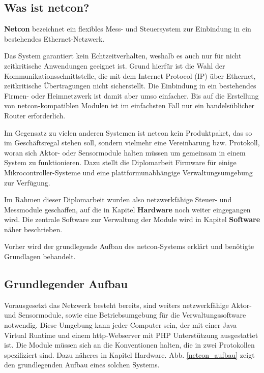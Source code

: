 \documentclass[a4paper,14pt,headsepline]{scrartcl}
\begin{document}
\subsection{Was ist netcon?}
\textbf{Netcon} bezeichnet ein flexibles Mess- und Steuersystem zur Einbindung in ein bestehendes Ethernet-Netzwerk. 

Das System garantiert kein Echtzeitverhalten, weshalb es auch nur für nicht zeitkritische Anwendungen geeignet ist. Grund hierfür ist die Wahl der Kommunikationsschnittstelle, die mit dem Internet Protocol (IP) über Ethernet, zeitkritische Übertragungen nicht sicherstellt. Die Einbindung in ein bestehendes Firmen- oder Heimnetzwerk ist damit aber umso einfacher. Bis auf die Erstellung von netcon-kompatiblen Modulen ist im einfachsten Fall nur ein handelsüblicher Router erforderlich.

Im Gegensatz zu vielen anderen Systemen ist netcon kein Produktpaket, das so im Geschäftsregal stehen soll, sondern vielmehr eine Vereinbarung bzw. Protokoll, woran sich Aktor- oder Sensormodule halten müssen um gemeinsam in einem System zu funktionieren. Dazu stellt die Diplomarbeit Firmware für einige Mikrocontroller-Systeme und eine plattformunabhängige Verwaltungsumgebung zur Verfügung. 

Im Rahmen dieser Diplomarbeit wurden also netzwerkfähige Steuer- und Messmodule geschaffen, auf die in Kapitel \textbf{Hardware} noch weiter eingegangen wird. Die zentrale Software zur Verwaltung der Module wird in Kapitel \textbf{Software} näher beschrieben. 

Vorher wird der grundlegende Aufbau des netcon-Systems erklärt und benötigte Grundlagen behandelt.

\subsection{Grundlegender Aufbau}
Vorausgesetzt das Netzwerk besteht bereits, sind weiters netzwerkfähige Aktor- und Sensormodule, sowie eine Betriebsumgebung für die Verwaltungssoftware notwendig. Diese Umgebung kann jeder Computer sein, der mit einer Java Virtual Runtime und einem http-Webserver mit PHP Unterstützung ausgestattet ist. Die Module müssen sich an die Konventionen halten, die in zwei Protokollen spezifiziert sind. Dazu näheres in Kapitel Hardware. Abb. \ref{netcon_aufbau} zeigt den grundlegenden Aufbau eines solchen Systems. 
\end{document}
